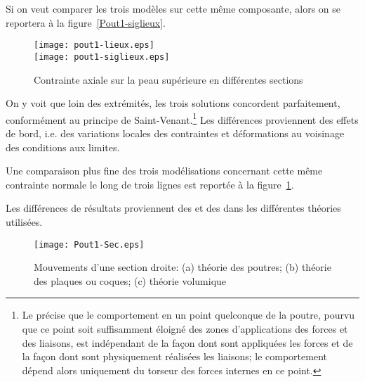 \medskip
Si on veut comparer les trois modèles sur cette même composante, alors
on se reportera à la figure~\ref{Pout1-siglieux}.
\begin{figure}[ht]
\centering
\texttt{[image: pout1-lieux.eps]}\\
\texttt{[image: pout1-siglieux.eps]}
\caption{Contrainte axiale sur la peau supérieure en différentes sections}
\end{figure}\label{Pout1-siglieux}
On y voit que loin des extrémités, les trois solutions concordent parfaitement, conformément
au principe de Saint-Venant.\footnote{Le  précise que le comportement
en un point quelconque de la poutre, pourvu que ce point soit suffisamment éloigné des zones
d'applications des forces et des liaisons, est indépendant de la façon dont sont appliquées
les forces et de la façon dont sont physiquement réalisées les liaisons; le comportement
dépend alors uniquement du torseur des forces internes en ce point.}
Les différences proviennent des effets de bord, i.e. des variations
locales des contraintes et déformations au voisinage des conditions aux limites.

Une comparaison plus fine des trois modélisations concernant cette même contrainte normale
le long de trois lignes est reportée à la figure~\ref{Pout1-sec}.

\medskip
Les différences de résultats proviennent des 
et des  dans les différentes théories utilisées.
\begin{figure}[ht]
\centering
\texttt{[image: Pout1-Sec.eps]}
\caption{Mouvements d'une section droite: (a) théorie des poutres;
(b) théorie des plaques ou coques; (c) théorie volumique}\label{Pout1-sec}
\end{figure}

